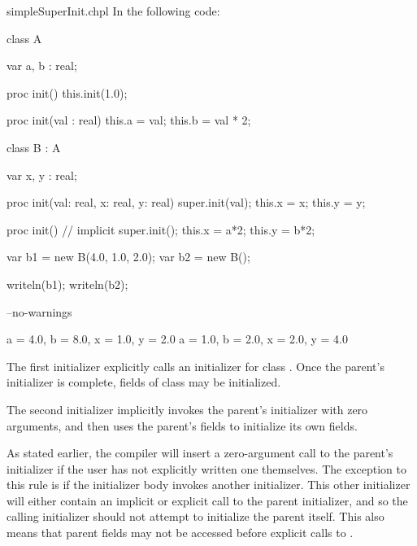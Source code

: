 \begin{chapelexample}{simpleSuperInit.chpl}
In the following code:
\begin{chapel}
class A {
  var a, b : real;

  proc init() {
    this.init(1.0);
  }

  proc init(val : real) {
    this.a = val;
    this.b = val * 2;
  }
}

class B : A {
  var x, y : real;

  proc init(val: real, x: real, y: real) {
    super.init(val);
    this.x = x;
    this.y = y;
  }

  proc init() {
    // implicit super.init();
    this.x = a*2;
    this.y = b*2;
  }
}

var b1 = new B(4.0, 1.0, 2.0);
var b2 = new B();
\end{chapel}
\begin{chapelpost}
writeln(b1);
writeln(b2);
\end{chapelpost}
\begin{chapelcompopts}
--no-warnings
\end{chapelcompopts}
\begin{chapeloutput}
{a = 4.0, b = 8.0, x = 1.0, y = 2.0}
{a = 1.0, b = 2.0, x = 2.0, y = 4.0}
\end{chapeloutput}
The first initializer explicitly calls an initializer for class . Once
the parent's initializer is complete, fields of class  may be
initialized.

The second initializer implicitly invokes the parent's initializer with zero
arguments, and then uses the parent's fields to initialize its own fields.
\end{chapelexample}

As stated earlier, the compiler will insert a zero-argument call to the
parent's initializer if the user has not explicitly written one themselves.
The exception to this rule is if the initializer body invokes another
initializer. This other initializer will either contain an implicit or explicit
call to the parent initializer, and so the calling initializer should not
attempt to initialize the parent itself. This also means that parent fields
may not be accessed before explicit calls to .

